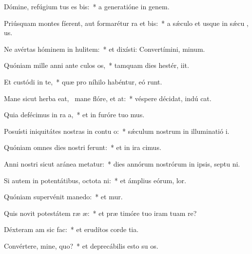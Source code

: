 \item Dómine, refúgium tus es bis:~* a generatióne in genem.
\item Priúsquam montes fíerent, aut formarétur ra et bis:~* a sǽculo et usque in sǽcu  , us.
\item Ne avértas hóminem in hulitem:~* et dixísti: Convertímini,  minum.
\item Quóniam mille anni ante culos os,~* tamquam dies hestér,  iit.
\item Et custódi in te,~* quæ pro níhilo habéntur, eó  runt.
\item Mane sicut herba eat,~\pscross{} mane flóre, et at:~* véspere décidat, indú  cat.
\item Quia defécimus in ra a,~* et in furóre tuo  mus.
\item Posuísti iniquitátes nostras in contu o:~* sǽculum nostrum in illuminatió  i.
\item Quóniam omnes dies nostri ferunt:~* et in ira  cimus.
\item Anni nostri sicut aránea metatur:~* dies annórum nostrórum in ipsis, septu ni.
\item Si autem in potentátibus, octota ni:~* et ámplius eórum,   lor.
\item Quóniam supervénit manedo:~* et mur.
\item Quis novit potestátem ræ æ:~* et præ timóre tuo iram tuam re?
\item Déxteram am sic  fac:~* et erudítos corde  tia.
\item Convértere, mine, quo?~* et deprecábilis esto su  os.
